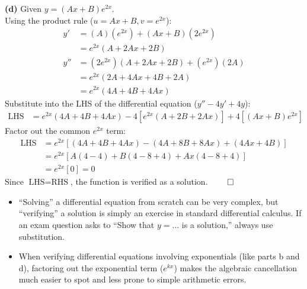 \begin{solution}
\vspace{0.3cm}

\textbf{(d)} Given $y = (Ax + B)e^{2x}$. \\
Using the product rule ($u = Ax+B, v = e^{2x}$):
\begin{align*}
    y' &= (A)(e^{2x}) + (Ax + B)(2e^{2x}) \\
    &= e^{2x}(A + 2Ax + 2B) \\[1ex]
    y'' &= (2e^{2x})(A + 2Ax + 2B) + (e^{2x})(2A) \\
    &= e^{2x}(2A + 4Ax + 4B + 2A) \\
    &= e^{2x}(4A + 4B + 4Ax)
\end{align*}
Substitute into the LHS of the differential equation ($y'' - 4y' + 4y$):
\begin{align*}
    \text{LHS} &= e^{2x}(4A + 4B + 4Ax) - 4\left[e^{2x}(A + 2B + 2Ax)\right] + 4\left[(Ax + B)e^{2x}\right]
\end{align*}
Factor out the common $e^{2x}$ term:
\begin{align*}
    \text{LHS} &= e^{2x} \left[ (4A + 4B + 4Ax) - (4A + 8B + 8Ax) + (4Ax + 4B) \right] \\
    &= e^{2x} \left[ A(4 - 4) + B(4 - 8 + 4) + Ax(4 - 8 + 4) \right] \\
    &= e^{2x} [ 0 ] = 0
\end{align*}
Since $\text{LHS} = \text{RHS}$, the function is verified as a solution. $\qed$
\end{solution}

\begin{takeaways}
\begin{itemize}[leftmargin=*]
    \item ``Solving'' a differential equation from scratch can be very complex, but ``verifying'' a solution is simply an exercise in standard differential calculus. If an exam question asks to ``Show that $y = \dots$ is a solution,'' always use substitution.
    \item When verifying differential equations involving exponentials (like parts b and d), factoring out the exponential term ($e^{kx}$) makes the algebraic cancellation much easier to spot and less prone to simple arithmetic errors.
\end{itemize}
\end{takeaways}

